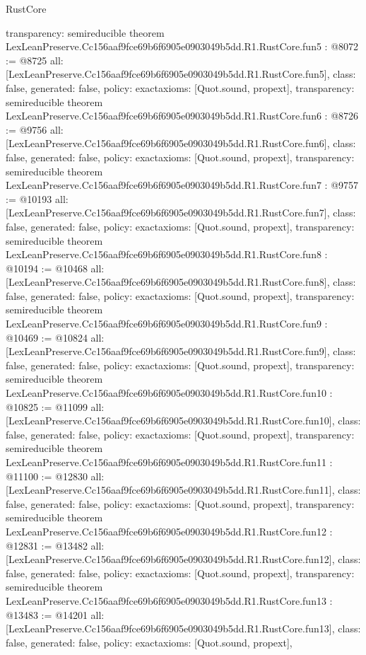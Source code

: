 \begin{lexlean}{RustCore}
\begin{coremodule}
{  transparency: semireducible
}
theorem LexLeanPreserve.Cc156aaf9fce69b6f6905e0903049b5dd.R1.RustCore.fun5 : @8072 := @8725 {
  all: [LexLeanPreserve.Cc156aaf9fce69b6f6905e0903049b5dd.R1.RustCore.fun5],
  class: false,
  generated: false,
  policy: exact{axioms: [Quot.sound, propext]},
  transparency: semireducible
}
theorem LexLeanPreserve.Cc156aaf9fce69b6f6905e0903049b5dd.R1.RustCore.fun6 : @8726 := @9756 {
  all: [LexLeanPreserve.Cc156aaf9fce69b6f6905e0903049b5dd.R1.RustCore.fun6],
  class: false,
  generated: false,
  policy: exact{axioms: [Quot.sound, propext]},
  transparency: semireducible
}
theorem LexLeanPreserve.Cc156aaf9fce69b6f6905e0903049b5dd.R1.RustCore.fun7 : @9757 := @10193 {
  all: [LexLeanPreserve.Cc156aaf9fce69b6f6905e0903049b5dd.R1.RustCore.fun7],
  class: false,
  generated: false,
  policy: exact{axioms: [Quot.sound, propext]},
  transparency: semireducible
}
theorem LexLeanPreserve.Cc156aaf9fce69b6f6905e0903049b5dd.R1.RustCore.fun8 : @10194 := @10468 {
  all: [LexLeanPreserve.Cc156aaf9fce69b6f6905e0903049b5dd.R1.RustCore.fun8],
  class: false,
  generated: false,
  policy: exact{axioms: [Quot.sound, propext]},
  transparency: semireducible
}
theorem LexLeanPreserve.Cc156aaf9fce69b6f6905e0903049b5dd.R1.RustCore.fun9 : @10469 := @10824 {
  all: [LexLeanPreserve.Cc156aaf9fce69b6f6905e0903049b5dd.R1.RustCore.fun9],
  class: false,
  generated: false,
  policy: exact{axioms: [Quot.sound, propext]},
  transparency: semireducible
}
theorem LexLeanPreserve.Cc156aaf9fce69b6f6905e0903049b5dd.R1.RustCore.fun10 : @10825 := @11099 {
  all: [LexLeanPreserve.Cc156aaf9fce69b6f6905e0903049b5dd.R1.RustCore.fun10],
  class: false,
  generated: false,
  policy: exact{axioms: [Quot.sound, propext]},
  transparency: semireducible
}
theorem LexLeanPreserve.Cc156aaf9fce69b6f6905e0903049b5dd.R1.RustCore.fun11 : @11100 := @12830 {
  all: [LexLeanPreserve.Cc156aaf9fce69b6f6905e0903049b5dd.R1.RustCore.fun11],
  class: false,
  generated: false,
  policy: exact{axioms: [Quot.sound, propext]},
  transparency: semireducible
}
theorem LexLeanPreserve.Cc156aaf9fce69b6f6905e0903049b5dd.R1.RustCore.fun12 : @12831 := @13482 {
  all: [LexLeanPreserve.Cc156aaf9fce69b6f6905e0903049b5dd.R1.RustCore.fun12],
  class: false,
  generated: false,
  policy: exact{axioms: [Quot.sound, propext]},
  transparency: semireducible
}
theorem LexLeanPreserve.Cc156aaf9fce69b6f6905e0903049b5dd.R1.RustCore.fun13 : @13483 := @14201 {
  all: [LexLeanPreserve.Cc156aaf9fce69b6f6905e0903049b5dd.R1.RustCore.fun13],
  class: false,
  generated: false,
  policy: exact{axioms: [Quot.sound, propext]},
}
\end{coremodule}
\end{lexlean}
